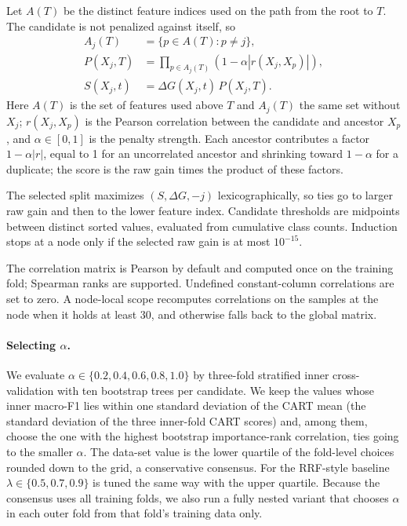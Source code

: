 \documentclass[pdflatex,sn-basic,Numbered]{sn-jnl}
\begin{document}
Let $A(T)$ be the distinct feature indices used on the path from the root to $T$. The candidate is not penalized against itself, so
\begin{align}
A_j(T)&=\{p\in A(T):p\neq j\},\\
P(X_j,T)&=\prod_{p\in A_j(T)}\left(1-\alpha |r(X_j,X_p)|\right),\\
S(X_j,t)&=\Delta G(X_j,t)\,P(X_j,T).
\end{align}
Here $A(T)$ is the set of features used above $T$ and $A_j(T)$ the same set without $X_j$; $r(X_j,X_p)$ is the Pearson correlation between the candidate and ancestor $X_p$, and $\alpha\in[0,1]$ is the penalty strength. Each ancestor contributes a factor $1-\alpha|r|$, equal to 1 for an uncorrelated ancestor and shrinking toward $1-\alpha$ for a duplicate; the score is the raw gain times the product of these factors.

The selected split maximizes $(S,\Delta G,-j)$ lexicographically, so ties go to larger raw gain and then to the lower feature index. Candidate thresholds are midpoints between distinct sorted values, evaluated from cumulative class counts. Induction stops at a node only if the selected raw gain is at most $10^{-15}$.

The correlation matrix is Pearson by default and computed once on the training fold; Spearman ranks are supported. Undefined constant-column correlations are set to zero. A node-local scope recomputes correlations on the samples at the node when it holds at least 30, and otherwise falls back to the global matrix.

\paragraph{Selecting $\alpha$.} We evaluate $\alpha\in\{0.2,0.4,0.6,0.8,1.0\}$ by three-fold stratified inner cross-validation with ten bootstrap trees per candidate. We keep the values whose inner macro-F1 lies within one standard deviation of the CART mean (the standard deviation of the three inner-fold CART scores) and, among them, choose the one with the highest bootstrap importance-rank correlation, ties going to the smaller $\alpha$. The data-set value is the lower quartile of the fold-level choices rounded down to the grid, a conservative consensus. For the RRF-style baseline $\lambda\in\{0.5,0.7,0.9\}$ is tuned the same way with the upper quartile. Because the consensus uses all training folds, we also run a fully nested variant that chooses $\alpha$ in each outer fold from that fold's training data only.
\end{document}
